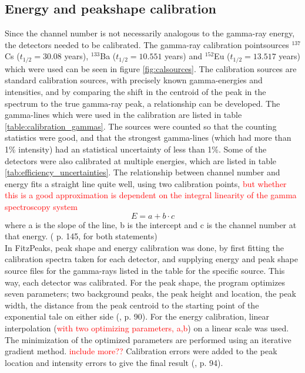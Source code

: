 \subsection{Energy and peakshape calibration}  \label{subsec:energy_peakshape_calibration}
Since the channel number is not necessarily analogous to the gamma-ray energy, the detectors needed to be calibrated. The gamma-ray calibration pointsources  $^{137}$Cs ($t_{1/2}=30.08$ years\cite{Browne2007}), $^{133}$Ba ($t_{1/2}=10.551$ years\cite{Khazov2011}) and $^{152}$Eu ($t_{1/2}=13.517$ years\cite{Martin2013}) which were used can be seen in figure \ref{fig:calsources}. The calibration sources are standard calibration sources, with precisely known gamma-energies and intensities, and by comparing the shift in the centroid of the peak in the spectrum to the true gamma-ray peak, a relationship can be developed. The gamma-lines which were used in the calibration are listed in table \ref{table:calibration_gammas}. The sources were counted so that the counting statistics were good, and that the strongest gamma-lines (which had more than 1\% intensity) had an statistical uncertainty of less than 1\%. Some of the detectors were also calibrated at multiple energies, which are listed in table \ref{tab:efficiency_uncertainties}. The relationship between channel number and energy fits a straight line quite well, using two calibration points, \textcolor{red}{but whether this is a good approximation is dependent on the integral linearity of the gamma spectroscopy system} 
\begin{equation}
    E = a+b\cdot c
\end{equation}
where a is the slope of the line, b is the intercept and c is the channel number at that energy. 
(\cite{Gilmore2008} p. 145, for both statements) \\

In FitzPeaks, peak shape and energy calibration was done, by first fitting the calibration spectra taken for each detector, and  supplying energy and peak shape source files for the gamma-rays listed in the table for the specific source. This way, each detector was calibrated. For the peak shape, the program optimizes seven parameters; two background peaks, the peak height and location, the peak width, the distance from the peak centroid to the starting point of the exponential tale on either side (\cite{Koskelo1981}, p. 90). 
For the energy calibration, linear interpolation (\textcolor{red}{with two optimizing parameters, a,b}) on a linear scale was used. The minimization of the optimized parameters are performed using an iterative gradient method. \textcolor{red}{include more??}  Calibration errors were added to the peak location and intensity errors to give the final result (\cite{Koskelo1981}, p. 94). 

